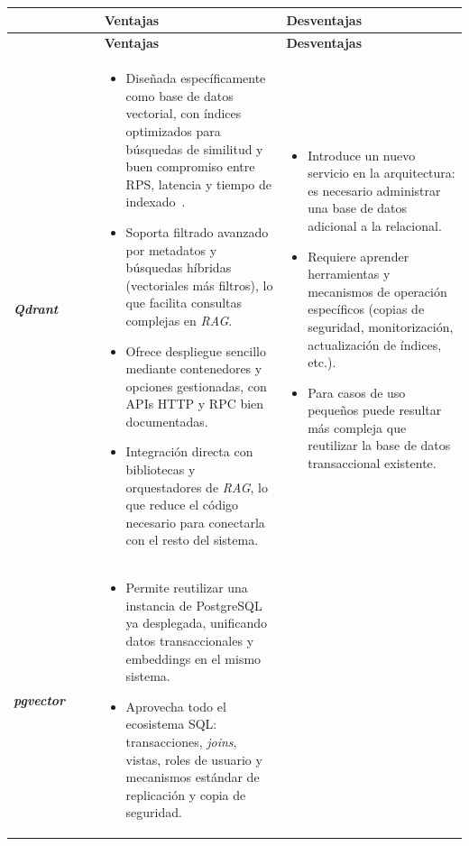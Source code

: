 \begin{longtable}{
		p{0.20\linewidth}
		p{0.40\linewidth}
		p{0.40\linewidth}
	}
	
    \toprule
    & \textbf{Ventajas} & \textbf{Desventajas} \\
    \midrule
    \endfirsthead

	\toprule
	& \textbf{Ventajas} & \textbf{Desventajas} \\
	\midrule
	\endhead
    \textbf{\textit{Qdrant}} &
      \begin{itemize}
        \tightlist
        \item Diseñada específicamente como base de datos vectorial, con índices optimizados para búsquedas de similitud y buen compromiso entre RPS, latencia y tiempo de indexado~\cite{llmeng:handbook}.
        \item Soporta filtrado avanzado por metadatos y búsquedas híbridas (vectoriales más filtros), lo que facilita consultas complejas en \textit{RAG}.
        \item Ofrece despliegue sencillo mediante contenedores y opciones gestionadas, con APIs HTTP y RPC bien documentadas.
        \item Integración directa con bibliotecas y orquestadores de \textit{RAG}, lo que reduce el código necesario para conectarla con el resto del sistema.
      \end{itemize}
      &
      \begin{itemize}
        \tightlist
        \item Introduce un nuevo servicio en la arquitectura: es necesario administrar una base de datos adicional a la relacional.
        \item Requiere aprender herramientas y mecanismos de operación específicos (copias de seguridad, monitorización, actualización de índices, etc.).
        \item Para casos de uso pequeños puede resultar más compleja que reutilizar la base de datos transaccional existente.
      \end{itemize}
      \\
    \midrule
    \textbf{\textit{pgvector}} &
      \begin{itemize}
        \tightlist
        \item Permite reutilizar una instancia de PostgreSQL ya desplegada, unificando datos transaccionales y embeddings en el mismo sistema.
        \item Aprovecha todo el ecosistema SQL: transacciones, \textit{joins}, vistas, roles de usuario y mecanismos estándar de replicación y copia de seguridad.

\end{itemize}
\end{longtable}
